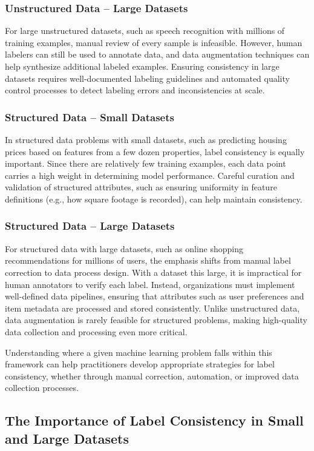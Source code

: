 \documentclass[12pt,openany]{book}
\begin{document}
\subsubsection{Unstructured Data – Large Datasets}
For large unstructured datasets, such as speech recognition with millions of training examples, manual review of every sample is infeasible. However, human labelers can still be used to annotate data, and data augmentation techniques can help synthesize additional labeled examples. Ensuring consistency in large datasets requires well-documented labeling guidelines and automated quality control processes to detect labeling errors and inconsistencies at scale.

\subsubsection{Structured Data – Small Datasets}
In structured data problems with small datasets, such as predicting housing prices based on features from a few dozen properties, label consistency is equally important. Since there are relatively few training examples, each data point carries a high weight in determining model performance. Careful curation and validation of structured attributes, such as ensuring uniformity in feature definitions (e.g., how square footage is recorded), can help maintain consistency.

\subsubsection{Structured Data – Large Datasets}
For structured data with large datasets, such as online shopping recommendations for millions of users, the emphasis shifts from manual label correction to data process design. With a dataset this large, it is impractical for human annotators to verify each label. Instead, organizations must implement well-defined data pipelines, ensuring that attributes such as user preferences and item metadata are processed and stored consistently. Unlike unstructured data, data augmentation is rarely feasible for structured problems, making high-quality data collection and processing even more critical.

Understanding where a given machine learning problem falls within this framework can help practitioners develop appropriate strategies for label consistency, whether through manual correction, automation, or improved data collection processes.


\subsection{The Importance of Label Consistency in Small and Large Datasets}
\end{document}
